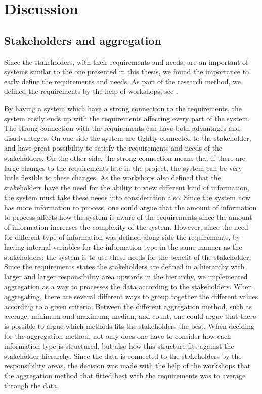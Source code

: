 \chapter{Discussion}
\label{chapter:discussion}

\section{Stakeholders and aggregation} %
\label{sec:discussion_stakeholders_and_aggregation}
Since the stakeholders, with their requirements and needs, are an important of
systems similar to the one presented in this thesis, we found the importance to
early define the requirements and needs. As part of the research method, we
defined the requirements by the help of workshops, see . 

By having a system which have a strong connection to the requirements, the 
system easily ends up with the requirements affecting every part of the 
system. The strong connection with the requirements can have both advantages 
and disadvantages. On one side the system are tightly connected to the
stakeholder, and have great possibility to satisfy the requirements and needs
of the stakeholders. On the other side, the strong connection means that if 
there are large changes to the requirements late in the project, the system 
can be very little flexible to these changes. As the workshops also defined 
that the stakeholders have the need for the ability to view different kind of 
information, the system must take these needs into consideration also. Since 
the system now has more information to process, one could argue that the 
amount of information to process affects how the system is aware of the 
requirements since the amount of information increases the complexity of the 
system. However, since the need for different type of information was defined 
along side the requirements, by having internal variables for the information 
type in the same manner as the stakeholders; the system is to use these needs 
for the benefit of the stakeholder. \\

Since the requirements states the stakeholders are defined in a hierarchy with
larger and larger responsibility area upwards in the hierarchy, we implemented
aggregation as a way to processes the data according to the stakeholders. When
aggregating, there are several different ways to group together the different
values according to a given criteria. Between the different aggregation method,
such as average, minimum and maximum, median, and count, one could argue that 
there is possible to argue which methods fits the stakeholders the best. When 
deciding for the aggregation method, not only does one have to consider how 
each information type is structured, but also how this structure fits against 
the stakeholder hierarchy. Since the data is connected to the stakeholders by 
the responsibility areas, the decision was made with the help of the workshops 
that the aggregation method that fitted best with the requirements was to 
average through the data.

